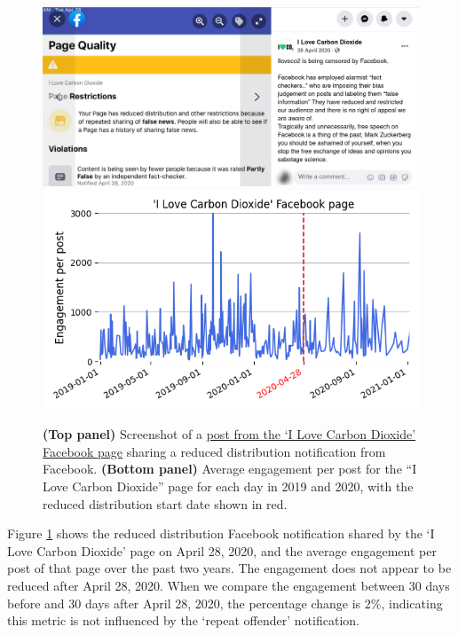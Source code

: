 \documentclass[11pt,a4paper]{article}
\begin{document}
\begin{figure}[!h]
\centering
\includegraphics[width=\linewidth]{./../figure/reduce_example_screenshot.png}
\includegraphics[width=\linewidth]{./../figure/reduce_example_timeseries.png}
\caption{{\bf(Top panel)} Screenshot of a \href{https://www.facebook.com/64162630683/posts/10156872415530684}{post from the `I Love Carbon Dioxide' Facebook page} sharing a reduced distribution notification from Facebook. {\bf(Bottom panel)} Average engagement per post for the “I Love Carbon Dioxide” page for each day in 2019 and 2020, with the reduced distribution start date shown in red.}
\label{reduce_example}
\end{figure}

Figure \ref{reduce_example} shows the reduced distribution Facebook notification shared by the ‘I Love Carbon Dioxide’ page on April 28, 2020, and the average engagement per post of that page over the past two years. 
The engagement does not appear to be reduced after April 28, 2020. 
When we compare the engagement between 30 days before and 30 days after April 28, 2020, the percentage change is $2\%$, indicating this metric is not influenced by the `repeat offender' notification.
\end{document}
